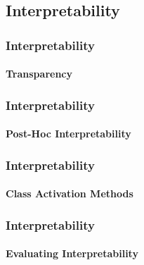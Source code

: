 \subsection*{Interpretability}
\begin{frame}[t]
    \frametitle{Interpretability}
    \framesubtitle{Transparency}
\end{frame}
\begin{frame}[t]
    \frametitle{Interpretability}
    \framesubtitle{Post-Hoc Interpretability}
    
\end{frame}
\begin{frame}[t]
    \frametitle{Interpretability}
    \framesubtitle{Class Activation Methods}
\end{frame}
\begin{frame}[t]
    \frametitle{Interpretability}
    \framesubtitle{Evaluating Interpretability}
\end{frame}